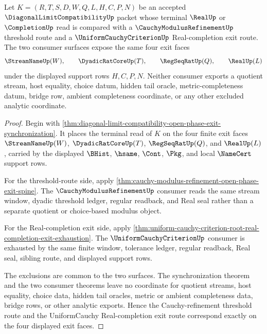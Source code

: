 \begin{theorem}
\label{thm:diagonal-limit-compatibility-root-route-cauchy-refinement-consumer-correspondence}
Let $K=(R,T,S,D,W,Q,L,H,C,P,N)$ be an accepted $\DiagonalLimitCompatibilityUp$ packet whose terminal $\RealUp$ or $\CompletionUp$ read is compared with a $\CauchyModulusRefinementUp$ threshold route and a $\UniformCauchyCriterionUp$ Real-completion exit route. The two consumer surfaces expose the same four exit faces
$$
\StreamNameUp(W),\qquad \DyadicRatCoreUp(T),\qquad \RegSeqRatUp(Q),\qquad \RealUp(L)
$$
under the displayed support rows $H,C,P,N$. Neither consumer exports a quotient stream, host equality, choice datum, hidden tail oracle, metric-completeness datum, bridge row, ambient completeness coordinate, or any other excluded analytic coordinate.
\end{theorem}
\begin{proof}
Begin with \autoref{thm:diagonal-limit-compatibility-open-phase-exit-synchronization}. It places the terminal read of $K$ on the four finite exit faces $\StreamNameUp(W)$, $\DyadicRatCoreUp(T)$, $\RegSeqRatUp(Q)$, and $\RealUp(L)$, carried by the displayed $\BHist$, $\hsame$, $\Cont$, $\Pkg$, and local $\NameCert$ support rows.

For the threshold-route side, apply \autoref{thm:cauchy-modulus-refinement-open-phase-exit-spine}. The $\CauchyModulusRefinementUp$ consumer reads the same stream window, dyadic threshold ledger, regular readback, and Real seal rather than a separate quotient or choice-based modulus object.

For the Real-completion exit side, apply \autoref{thm:uniform-cauchy-criterion-root-real-completion-exit-exhaustion}. The $\UniformCauchyCriterionUp$ consumer is exhausted by the same finite window, tolerance ledger, regular readback, Real seal, sibling route, and displayed support rows.

The exclusions are common to the two surfaces. The synchronization theorem and the two consumer theorems leave no coordinate for quotient streams, host equality, choice data, hidden tail oracles, metric or ambient completeness data, bridge rows, or other analytic exports. Hence the Cauchy-refinement threshold route and the UniformCauchy Real-completion exit route correspond exactly on the four displayed exit faces.
\end{proof}

